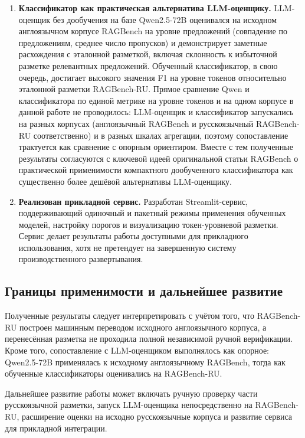 \begin{enumerate}
\begin{itemize}
    \end{itemize}

  \item \textbf{Классификатор как практическая альтернатива LLM-оценщику.}
  LLM-оценщик без дообучения на базе Qwen2.5-72B оценивался на исходном
  англоязычном корпусе RAGBench на уровне предложений (совпадение по
  предложениям, среднее число пропусков) и демонстрирует заметные расхождения
  с эталонной разметкой, включая склонность к избыточной разметке релевантных
  предложений. Обученный классификатор, в свою очередь, достигает высокого
  значения F1 на уровне токенов относительно эталонной разметки RAGBench-RU.
  Прямое сравнение Qwen и классификатора по единой метрике на уровне токенов
  и на одном корпусе в данной работе не проводилось: LLM-оценщик и классификатор
  запускались на разных корпусах (англоязычный RAGBench и русскоязычный
  RAGBench-RU соответственно) и в разных шкалах агрегации, поэтому сопоставление
  трактуется как сравнение с опорным ориентиром. Вместе с тем полученные
  результаты согласуются с ключевой идеей оригинальной статьи RAGBench о
  практической применимости компактного дообученного классификатора как
  существенно более дешёвой альтернативы LLM-оценщику.

  \item \textbf{Реализован прикладной сервис.}
  Разработан Streamlit-сервис, поддерживающий одиночный и пакетный режимы применения
  обученных моделей, настройку порогов и визуализацию токен-уровневой разметки. Сервис
  делает результаты работы доступными для прикладного использования, хотя не претендует
  на завершенную систему производственного развертывания.
\end{enumerate}

\subsection{Границы применимости и дальнейшее развитие}

Полученные результаты следует интерпретировать с учётом того, что RAGBench-RU
построен машинным переводом исходного англоязычного корпуса, а перенесённая
разметка не проходила полной независимой ручной верификации. Кроме того,
сопоставление с LLM-оценщиком выполнялось как опорное: Qwen2.5-72B применялась
к исходному англоязычному RAGBench, тогда как обученные классификаторы
оценивались на RAGBench-RU.

Дальнейшее развитие работы может включать ручную проверку части русскоязычной
разметки, запуск LLM-оценщика непосредственно на RAGBench-RU, расширение
оценки на исходно русскоязычные корпуса и развитие сервиса для прикладной
интеграции.

